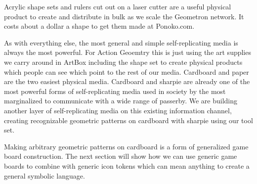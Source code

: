 Acrylic shape sets and rulers cut out on a laser cutter are a useful
physical product to create and distribute in bulk as we scale the
Geometron network. It costs about a dollar a shape to get them made at
Ponoko.com.

As with everything else, the most general and simple self-replicating
media is always the most powerful. For Action Geoemtry this is just
using the art supplies we carry around in ArtBox including the shape set
to create physical products which people can see which point to the rest
of our media. Cardboard and paper are the two easiest physical media.
Cardboard and sharpie are already one of the most powerful forms of
self-replicating media used in society by the most marginalized to
communicate with a wide range of passerby. We are building another layer
of self-replicating media on this existing information channel, creating
recognizable geometric patterns on cardboard with sharpie using our tool
set.

Making arbitrary geometric patterns on cardboard is a form of
generalized game board construction. The next section will show how we
can use generic game boards to combine with generic icon tokens which
can mean anything to create a general symbolic language.
